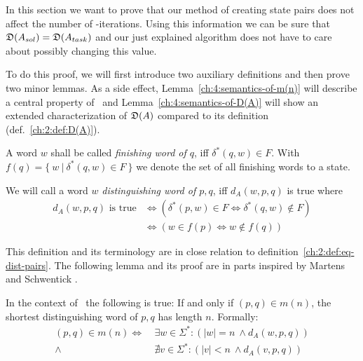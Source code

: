 In this section we want to prove that our method of creating state pairs does not affect the number of \CompDist-iterations. Using this information we can be sure that $\mathfrak{D}(A_{sol}) = \mathfrak{D}(A_{task})$ and our just explained algorithm does not have to care about possibly changing this value.

To do this proof, we will first introduce two auxiliary definitions and then prove two minor lemmas. As a side effect, Lemma~\ref{ch:4:semantics-of-m(n)} will describe a central property of \CompDist\ and Lemma~\ref{ch:4:semantics-of-D(A)} will show an extended characterization of $\mathfrak{D}(A)$ compared to its definition (def.~\ref{ch:2:def:D(A)}).

A word $w$ shall be called \emph{finishing word of $q$}, iff $\delta^*(q, w) \in F$. With $f(q) = \{\ w\ |\ \delta^*(q, w) \in F\ \}$ we denote the set of all finishing words to a state.
\begin{definition} \label{ch:4:def-dist-word}
	We will call a word $w$ \emph{distinguishing word of $p,q$}, iff $d_A(w, p, q)$ is true where
	\begin{align*}
	d_A(w, p, q) \text{ is true} &\Leftrightarrow (\delta^*(p,w) \in F \Leftrightarrow \delta^*(q,w) \notin F) \\
	&\Leftrightarrow (w \in f(p) \Leftrightarrow w \notin f(q))
	\end{align*}
\end{definition}
\noindent This definition and its terminology are in close relation to definition~\ref{ch:2:def:eq-dist-pairs}. The following lemma and its proof are in parts inspired by Martens and Schwentick \cite[ch.\ 4 p.\ 18]{MS18}.

\begin{lemma}\label{ch:4:semantics-of-m(n)}
    In the context of \CompDist\ the following is true: If and only if $(p,q)\in m(n)$, the shortest distinguishing word of $p,q$ has length $n$. Formally:
    \begin{align*}
        (p,q) \in m(n) \Longleftrightarrow\ &\exists w\in\Sigma^*\colon (|w| = n\ \land d_A(w, p, q))\\
        \land\ &\nexists v\in\Sigma^*\colon (|v| < n\ \land d_A(v, p, q))
    \end{align*}
\end{lemma}

